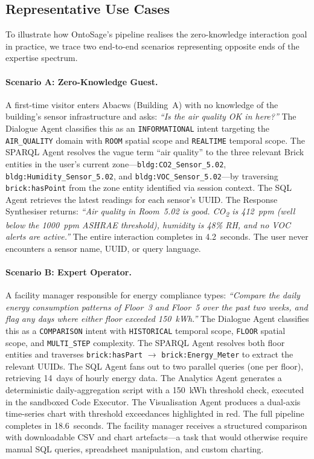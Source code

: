 \documentclass[acmsmall]{acmart}
\begin{document}
\subsection{Representative Use Cases}
\label{sec:use-cases}

To illustrate how OntoSage's pipeline realises the zero-knowledge interaction goal in practice, we trace two end-to-end scenarios representing opposite ends of the expertise spectrum.

\paragraph{Scenario A: Zero-Knowledge Guest.}
A first-time visitor enters Abacws (Building~A) with no knowledge of the building's sensor infrastructure and asks: \emph{``Is the air quality OK in here?''} The Dialogue Agent classifies this as an \texttt{INFORMATIONAL} intent targeting the \texttt{AIR\_QUALITY} domain with \texttt{ROOM} spatial scope and \texttt{REALTIME} temporal scope. The SPARQL Agent resolves the vague term ``air quality'' to the three relevant Brick entities in the user's current zone---\texttt{bldg:CO2\_Sensor\_5.02}, \texttt{bldg:Humidity\_Sensor\_5.02}, and \texttt{bldg:VOC\_Sensor\_5.02}---by traversing \texttt{brick:hasPoint} from the zone entity identified via session context. The SQL Agent retrieves the latest readings for each sensor's UUID. The Response Synthesiser returns: \emph{``Air quality in Room~5.02 is good. CO\textsubscript{2} is 412~ppm (well below the 1000~ppm ASHRAE threshold), humidity is 48\% RH, and no VOC alerts are active.''} The entire interaction completes in 4.2~seconds. The user never encounters a sensor name, UUID, or query language.

\paragraph{Scenario B: Expert Operator.}
A facility manager responsible for energy compliance types: \emph{``Compare the daily energy consumption patterns of Floor~3 and Floor~5 over the past two weeks, and flag any days where either floor exceeded 150~kWh.''} The Dialogue Agent classifies this as a \texttt{COMPARISON} intent with \texttt{HISTORICAL} temporal scope, \texttt{FLOOR} spatial scope, and \texttt{MULTI\_STEP} complexity. The SPARQL Agent resolves both floor entities and traverses \texttt{brick:hasPart} $\rightarrow$ \texttt{brick:Energy\_Meter} to extract the relevant UUIDs. The SQL Agent fans out to two parallel queries (one per floor), retrieving 14~days of hourly energy data. The Analytics Agent generates a deterministic daily-aggregation script with a 150~kWh threshold check, executed in the sandboxed Code Executor. The Visualisation Agent produces a dual-axis time-series chart with threshold exceedances highlighted in red. The full pipeline completes in 18.6~seconds. The facility manager receives a structured comparison with downloadable CSV and chart artefacts---a task that would otherwise require manual SQL queries, spreadsheet manipulation, and custom charting.
\end{document}
